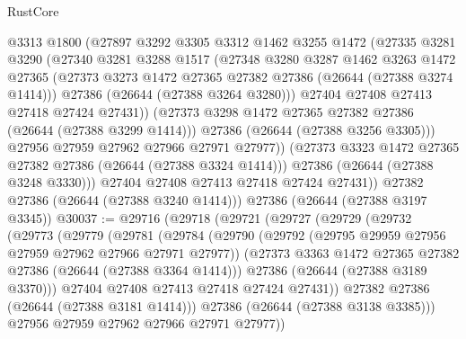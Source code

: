 \begin{lexlean}{RustCore}
\begin{coremodule}
                @3313
                @1800
                (@27897
                  @3292
                  @3305
                  @3312
                  @1462
                  @3255
                  @1472
                  (@27335
                    @3281
                    @3290
                    (@27340
                      @3281
                      @3288
                      @1517
                      (@27348
                        @3280
                        @3287
                        @1462
                        @3263
                        @1472
                        @27365
                        (@27373 @3273 @1472 @27365 @27382 @27386 (@26644 (@27388 @3274 @1414)))
                        @27386
                        (@26644 (@27388 @3264 @3280)))
                      @27404
                      @27408
                      @27413
                      @27418
                      @27424
                      @27431))
                  (@27373 @3298 @1472 @27365 @27382 @27386 (@26644 (@27388 @3299 @1414)))
                  @27386
                  (@26644 (@27388 @3256 @3305)))
                @27956
                @27959
                @27962
                @27966
                @27971
                @27977))
            (@27373 @3323 @1472 @27365 @27382 @27386 (@26644 (@27388 @3324 @1414)))
            @27386
            (@26644 (@27388 @3248 @3330)))
          @27404
          @27408
          @27413
          @27418
          @27424
          @27431))
      @27382
      @27386
      (@26644 (@27388 @3240 @1414)))
    @27386
    (@26644 (@27388 @3197 @3345))
@30037 := @29716
    (@29718
      (@29721
        (@29727
          (@29729
            (@29732
              (@29773
                (@29779
                  (@29781
                    (@29784
                      (@29790
                        (@29792 (@29795 @29959 @27956 @27959 @27962 @27966 @27971 @27977))
                        (@27373 @3363 @1472 @27365 @27382 @27386 (@26644 (@27388 @3364 @1414)))
                        @27386
                        (@26644 (@27388 @3189 @3370)))
                      @27404
                      @27408
                      @27413
                      @27418
                      @27424
                      @27431))
                  @27382
                  @27386
                  (@26644 (@27388 @3181 @1414)))
                @27386
                (@26644 (@27388 @3138 @3385)))
              @27956
              @27959
              @27962
              @27966
              @27971
              @27977))

\end{coremodule}
\end{lexlean}
